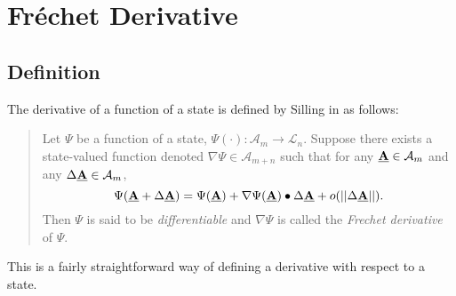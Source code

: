 \documentclass[preprint,review,12pt]{elsarticle}
\newcommand\vstate[3]{%
	\mathbf{\underline{#1}}%
	\ifstrempty{#2}{}{[#2]}%
	\ifstrempty{#3}{}{\langle #3 \rangle}}
\begin{document}
\appendix
\section{Fr\'echet Derivative}
\label{sec:frechet}
\subsection{Definition}
The derivative of a function of a state is defined by Silling in \cite{silling2007peridynamic} as follows:
\begin{quote}
Let $\Psi$ be a function of a state, $\Psi(\cdot):\mathcal{A}_m\rightarrow\mathcal{L}_n$. Suppose there exists a state-valued function denoted $\nabla\Psi\in\mathcal{A}_{m+n}$ such that for any $\vstate{A}{}{}\in\mathcal{A}_m$ and any $\Delta\vstate{A}{}{}\in\mathcal{A}_m$,
\begin{equation}
  \Psi(\vstate{A}{}{}+\Delta\vstate{A}{}{})=\Psi(\vstate{A}{}{})+\nabla\Psi(\vstate{A}{}{})\bullet\Delta\vstate{A}{}{}+o(||\Delta\vstate{A}{}{}||).
\end{equation}
Then $\Psi$ is said to be \textit{differentiable} and $\nabla\Psi$ is called the \textit{Frechet derivative} of $\Psi$.
\end{quote}
This is a fairly straightforward way of defining a derivative with respect to a state.
\end{document}
